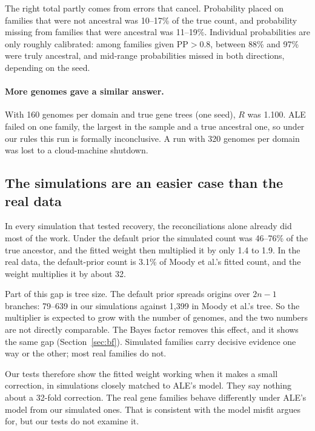 \documentclass[11pt]{article}
\newcommand{\PP}{\mathrm{PP}}
\begin{document}
The right total partly comes from errors that cancel. Probability placed on families that were not ancestral was 10--17\% of the true count, and probability missing from families that were ancestral was 11--19\%. Individual probabilities are only roughly calibrated: among families given $\PP > 0.8$, between 88\% and 97\% were truly ancestral, and mid-range probabilities missed in both directions, depending on the seed.

\paragraph{More genomes gave a similar answer.} With 160 genomes per domain and true gene trees (one seed), $R$ was 1.100. ALE failed on one family, the largest in the sample and a true ancestral one, so under our rules this run is formally inconclusive. A run with 320 genomes per domain was lost to a cloud-machine shutdown.

\subsection{The simulations are an easier case than the real data}\label{sec:regime}
In every simulation that tested recovery, the reconciliations alone already did most of the work. Under the default prior the simulated count was 46--76\% of the true ancestor, and the fitted weight then multiplied it by only 1.4 to 1.9. In the real data, the default-prior count is 3.1\% of Moody et al.'s fitted count, and the weight multiplies it by about 32.

Part of this gap is tree size. The default prior spreads origins over $2n - 1$ branches: 79--639 in our simulations against 1,399 in Moody et al.'s tree. So the multiplier is expected to grow with the number of genomes, and the two numbers are not directly comparable. The Bayes factor removes this effect, and it shows the same gap (Section~\ref{sec:bf}). Simulated families carry decisive evidence one way or the other; most real families do not.

Our tests therefore show the fitted weight working when it makes a small correction, in simulations closely matched to ALE's model. They say nothing about a 32-fold correction. The real gene families behave differently under ALE's model from our simulated ones. That is consistent with the model misfit \citet{csuros2026} argues for, but our tests do not examine it.
\end{document}
